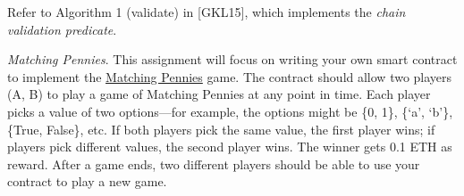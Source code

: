 \documentclass[12pt,addpoints,answers]{exam}
\begin{document}
\begin{questions}
\begin{solution}
\end{solution}

\newpage


\question Refer to Algorithm 1 ({\sf validate}) in [GKL15], which implements the {\em chain validation predicate}. 


\newpage

 {\em Matching Pennies}. This assignment will focus on writing your own smart contract to implement the \href{https://en.wikipedia.org/wiki/Matching_pennies}{Matching Pennies} game. The contract should allow two players (A, B) to play a game of Matching Pennies at any point in time. Each player picks a value of two options---for example, the options might be \{0, 1\}, \{`a’, ‘b’\}, \{True, False\}, etc. If both players pick the same value, the first player wins; if players pick different values, the second player wins. The winner gets 0.1 ETH as reward. After a game ends, two different players should be able to use your contract to play a new game.


\end{questions}
\end{document}
